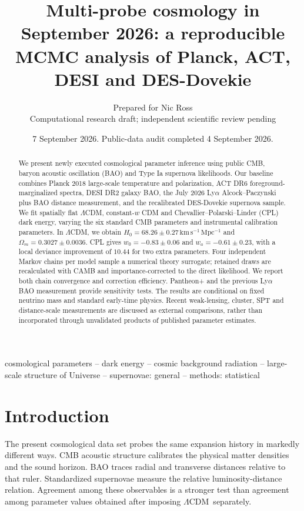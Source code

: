 \documentclass[fleqn,usenatbib]{mnras}
\title[Multi-probe cosmology in September 2026]{Multi-probe cosmology in September 2026: a reproducible MCMC analysis of Planck, ACT, DESI and DES-Dovekie}
\author[Research draft]{Prepared for Nic Ross\\
\small Computational research draft; independent scientific review pending}
\date{7 September 2026. Public-data audit completed 4 September 2026.}
\newcommand{\lcdm}{$\Lambda$CDM}
\newcommand{\hunit}{\mathrm{km\,s^{-1}\,Mpc^{-1}}}
\begin{document}
\pagestyle{headings}
\label{firstpage}
\pagerange{\pageref{firstpage}--\pageref{lastpage}}
\maketitle
\begin{abstract}
We present newly executed cosmological parameter inference using public CMB,
baryon acoustic oscillation (BAO) and Type Ia supernova likelihoods. Our baseline
combines Planck 2018 large-scale temperature and polarization, ACT DR6
foreground-marginalized spectra, DESI DR2 galaxy BAO, the July 2026 Ly$\alpha$
Alcock--Paczynski plus BAO distance measurement, and the recalibrated
DES-Dovekie supernova sample. We fit spatially flat \lcdm, constant-$w$ CDM and
Chevallier--Polarski--Linder (CPL) dark energy, varying the six standard CMB
parameters and instrumental calibration parameters. In \lcdm, we obtain $H_0=68.26\pm0.27\,\hunit$ and $\Omega_m=0.3027\pm0.0036$. CPL gives $w_0=-0.83\pm0.06$ and $w_a=-0.61\pm0.23$, with a local deviance improvement of $10.44$ for two extra parameters. 
Four independent Markov chains per model sample a numerical theory surrogate;
retained draws are recalculated with CAMB and importance-corrected to the direct
likelihood. We report both chain convergence and correction efficiency.
Pantheon+ and the previous Ly$\alpha$ BAO measurement provide sensitivity tests.
The results are conditional on fixed neutrino mass and standard early-time
physics. Recent weak-lensing, cluster, SPT and distance-scale measurements are
discussed as external comparisons, rather than incorporated through unvalidated
products of published parameter estimates.
\end{abstract}
\begin{keywords}
cosmological parameters -- dark energy -- cosmic background radiation --
large-scale structure of Universe -- supernovae: general -- methods: statistical
\end{keywords}

\section{Introduction}
The present cosmological data set probes the same expansion history in markedly
different ways. CMB acoustic structure calibrates the physical matter densities
and the sound horizon. BAO traces radial and transverse distances relative to
that ruler. Standardized supernovae measure the relative luminosity-distance
relation. Agreement among these observables is a stronger test than agreement
among parameter values obtained after imposing \lcdm\ separately.
\end{document}
